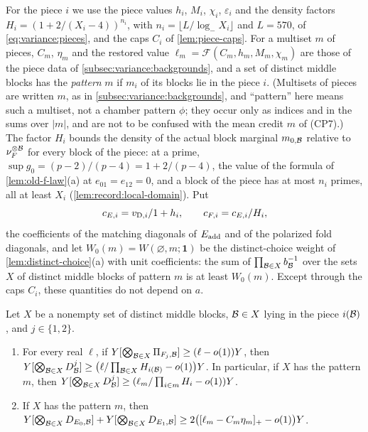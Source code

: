 For the piece $i$ we use the piece values $h_i$, $M_i$, $\chi_i$,
$\varepsilon_i$ and the density factors $H_i=(1+2/(X_i-4))^{n_i}$, with
$n_i=\lfloor L/\log_-X_i\rfloor$ and $L=570$, of \eqref{eq:variance:pieces}, and
the caps $C_i$ of \cref{lem:piece-caps}. For a multiset $m$ of pieces, $C_m$,
$\eta_m$ and the restored value $\ell_m=\mathcal F(C_m,h_m,M_m,\chi_m)$ are those
of the piece data of \cref{subsec:variance:backgrounds}, and a set of distinct
middle blocks has the \emph{pattern} $m$ if $m_i$ of its blocks lie in the
piece $i$. (Multisets of pieces are written $m$, as in \cref{subsec:variance:backgrounds}, and ``pattern'' here means such a multiset, not a chamber pattern $\phi$; they occur only as indices and in the
sums over $|m|$, and are not to be confused with the mean credit $m$ of
(CP7).) The factor $H_i$ bounds the density of the actual block marginal $m_{0,\Blk}$
relative to $\nu_F^{\otimes\Blk}$ for every block of the piece: at a prime,
$\sup g_0=(p-2)/(p-4)=1+2/(p-4)$, the value of the formula of
\cref{lem:old-f-law}(a) at $e_{01}=e_{12}=0$, and a block of the piece has at most
$n_i$ primes, all at least $X_i$ (\cref{lem:record:local-domain}). Put
\[
 c_{E,i}=\frac{v_{{\rm D},i}}{1+h_i},\qquad c_{F,i}=\frac{c_{E,i}}{H_i},
\]
the coefficients of the matching diagonals of $E_{\rm add}$ and of the polarized
fold diagonals, and let $W_0(m)=W(\varnothing,m;\mathbf1)$ be the distinct-choice
weight of \cref{lem:distinct-choice}(a) with unit coefficients: the sum of
$\prod_{\Blk\in X}b_\Blk^{-1}$ over the sets $X$ of distinct middle blocks of
pattern $m$ is at least $W_0(m)$. Except through the caps $C_i$, these
quantities do not depend on $a$.

\begin{lemma}\label{lem:record:companion-energy}
Let $X$ be a nonempty set of distinct middle blocks, $\Blk\in X$ lying in the
piece $i(\Blk)$, and $j\in\{1,2\}$.
\begin{enumerate}[label=(\alph*)]
\item For every real $\ell$, if $Y[\bigotimes_{\Blk\in X}\Pi_{F_j,\Blk}]\ge(\ell-o(1))Y$, then
 $Y[\bigotimes_{\Blk\in X}D^j_\Blk]\ge\bigl(\ell/\prod_{\Blk\in X}H_{i(\Blk)}-o(1)\bigr)Y$.
 In particular, if $X$ has the pattern $m$, then
 $Y[\bigotimes_{\Blk\in X}D^j_\Blk]\ge(\ell_m/\prod_{i\in m}H_i-o(1))Y$.
\item If $X$ has the pattern $m$, then
 $Y[\bigotimes_{\Blk\in X}D_{E_0,\Blk}]+Y[\bigotimes_{\Blk\in X}D_{E_1,\Blk}]
 \ge2\bigl([\ell_m-C_m\eta_m]_+-o(1)\bigr)Y$.
\end{enumerate}
\end{lemma}

